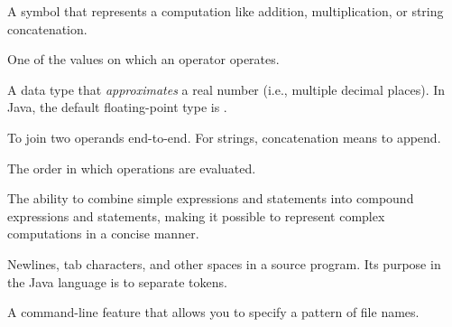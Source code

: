\begin{description}
A symbol that represents a computation like addition, multiplication, or string concatenation.

One of the values on which an operator operates.

A data type that {\em approximates} a real number (i.e., multiple decimal places).
In Java, the default floating-point type is .

To join two operands end-to-end.
For strings, concatenation means to append.

The order in which operations are evaluated.

The ability to combine simple expressions and statements into compound expressions and statements, making it possible to represent complex computations in a concise manner.

Newlines, tab characters, and other spaces in a source program.
Its purpose in the Java language is to separate tokens.

A command-line feature that allows you to specify a pattern of file names.

\end{description}
